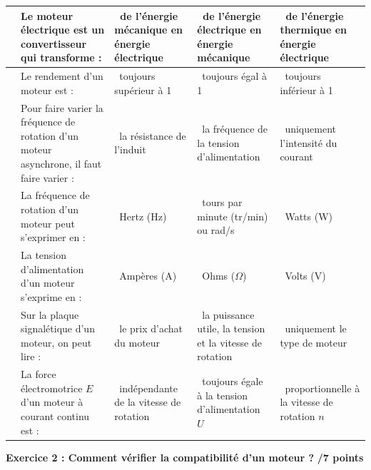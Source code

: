 \documentclass[11pt,a4paper]{article}
\renewcommand{\arraystretch}{1.8}
\newcommand*\acocher{\leavevmode{\fboxsep0pt \fboxrule0.8pt \fbox{\vrule height1.8ex depth.1ex width0pt \vrule height0pt depth0pt width1.9ex }}}
\begin{document}
\begin{center}
\renewcommand{\arraystretch}{2.5}
\begin{tabular}{|m{4mm}|p{4.5cm}||m{3.5cm}|m{3.5cm}|m{3.5cm}|}
	\hline
	\ding{202} & Le moteur électrique est un convertisseur qui transforme :
		& \acocher~de l'énergie mécanique en énergie électrique
		& \acocher~de l'énergie électrique en énergie mécanique
		& \acocher~de l'énergie thermique en énergie électrique \\
	\hline
	\ding{203} & Le rendement d'un moteur est :
		& \acocher~toujours supérieur à 1
		& \acocher~toujours égal à 1
		& \acocher~toujours inférieur à 1 \\
	\hline
	\ding{204} & Pour faire varier la fréquence de rotation d'un moteur asynchrone, il faut faire varier :
		& \acocher~la résistance de l'induit
		& \acocher~la fréquence de la tension d'alimentation
		& \acocher~uniquement l'intensité du courant \\
	\hline
	\ding{205} & La fréquence de rotation d'un moteur peut s'exprimer en :
		& \acocher~Hertz (Hz)
		& \acocher~tours par minute (tr/min) ou rad/s
		& \acocher~Watts (W) \\
	\hline
	\ding{206} & La tension d'alimentation d'un moteur s'exprime en :
		& \acocher~Ampères (A)
		& \acocher~Ohms ($\Omega$)
		& \acocher~Volts (V) \\
	\hline
	\ding{207} & Sur la plaque signalétique d'un moteur, on peut lire :
		& \acocher~le prix d'achat du moteur
		& \acocher~la puissance utile, la tension et la vitesse de rotation
		& \acocher~uniquement le type de moteur \\
	\hline
	\ding{208} & La force électromotrice $E$ d'un moteur à courant continu est :
		& \acocher~indépendante de la vitesse de rotation
		& \acocher~toujours égale à la tension d'alimentation $U$
		& \acocher~proportionnelle à la vitesse de rotation $n$ \\
	\hline
\end{tabular}
\end{center}

\vfill
\newpage

\textbf{Exercice 2 : Comment vérifier la compatibilité d'un moteur ?}
\hfill \textbf{/7 points}

\vspace{3mm}
\end{document}
